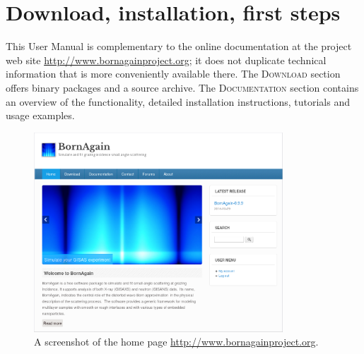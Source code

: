 

\newpage
\chapter{Download, installation, first steps} 

This User Manual is complementary to the online documentation
at the project web site \url{http://www.bornagainproject.org};
it does not duplicate technical information that is more conveniently
available there.
The \textsc{Download} section offers
binary packages and a source archive.
The \textsc{Documentation} section contains an overview
of the functionality,
detailed installation instructions,
tutorials and usage examples.

\begin{figure}[ht]
\begin{center}
\includegraphics[width=0.83\textwidth]{Figures/screenshot/website.png}
\end{center}
\caption{A screenshot of the home page
         \url{http://www.bornagainproject.org}.}
\label{fig:website}
\end{figure}
